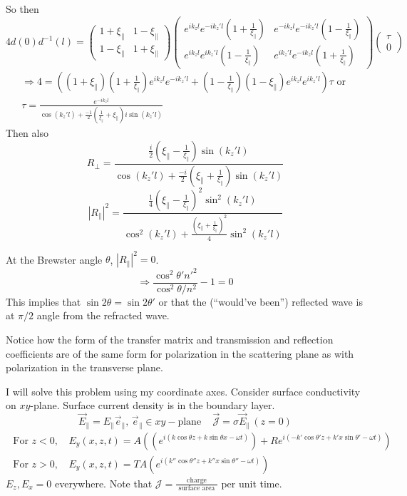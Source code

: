\documentclass[twoside,10pt]{amsart}
\newcommand{\problemhead}[1]
  {\smallskip
   \noindent{\large\bf Problem #1.}
   \smallskip}
\begin{document}
So then 
\[
4 d(0) d^{-1}(l) = \left( \begin{matrix} 1 + \xi_{\parallel} & 1 - \xi_{\parallel} \\ 1 - \xi_{\parallel} & 1 + \xi_{\parallel} \end{matrix} \right) \left( \begin{matrix} e^{ik_z l} e^{-ik_z' l} ( 1 + \frac{1}{\xi_{\parallel}} ) & e^{-ik_zl }e^{-ik_z' l} (1 - \frac{1}{\xi_{\parallel} } ) \\ e^{ik_z l}e^{ i k_z' l} (1 - \frac{1}{\xi_{\parallel} }) & e^{ik_z'l} e^{-ik_z l} (1 + \frac{1}{\xi_{\parallel} }) \end{matrix} \right) \left( \begin{matrix} \tau \\ 0 \end{matrix} \right)
\]
\[
\begin{gathered}
  \Longrightarrow 4 = ((1+\xi_{\parallel} )(1 + \frac{1}{\xi_{\parallel} } ) e^{i k_z l } e^{-ik_z' l} + ( 1 - \frac{1}{\xi_{\parallel}} )( 1 -\xi_{\parallel} ) e^{ik_z l} e^{ik_z' l} )\tau \text{ or } \\
  \tau = \frac{ e^{-i k_zl } }{ \cos{(k_z' l) } + \frac{-1}{2} (\frac{1}{\xi_{\parallel}} + \xi_{\parallel} ) i \sin{(k_z' l) } }
\end{gathered}
\]
Then also
\[
R_{\perp} =\frac{ \frac{i}{2} ( \xi_{\parallel} - \frac{1}{\xi_{\parallel} } ) \sin{(k_z' l) } }{ \cos{(k_z' l)} + \frac{-i}{2} (\xi_{\parallel} + \frac{1}{\xi_{\parallel}} )\sin{(k_z' l) }}
\]
\[
|R_{\parallel}|^2 = \frac{ \frac{1}{4} ( \xi_{\parallel} - \frac{1}{ \xi_{\parallel}})^2 \sin^2{ (k_z' l) } }{ \cos^2{( k_z' l) } + \frac{ (\xi_{\parallel} + \frac{1}{ \xi_{\parallel} } )^2 }{ 4} \sin^2{ (k_z' l) } }
\]

At the Brewster angle $\theta$, $|R_{\parallel}|^2 =0$.  
\[
\Longrightarrow \frac{ \cos^2{\theta'}{n'^2} }{ \cos^2{\theta} /n^2 } - 1 =0 
\]
This implies that $\sin{2\theta} = \sin{2\theta'}$ or that the (``would've been'') reflected wave is at $\pi/2$ angle from the refracted wave.

Notice how the form of the transfer matrix and transmission and reflection coefficients are of the same form for polarization in the scattering plane as with polarization in the transverse plane.  

\problemhead{12.2} I will solve this problem using my coordinate axes.  Consider surface conductivity on $xy$-plane.  Surface current density is in the boundary layer.  
\[
\vec{E}_{\parallel} = E_{\parallel} \vec{e}_{\parallel}, \, \vec{e}_{\parallel} \in xy-\text{plane} \quad \, \vec{\mathcal{J}} = \sigma \vec{E}_{\parallel} \, (z=0)
\]
\[
\begin{aligned} 
\text{ For $z<0$, } & E_y(x,z,t) = A ((e^{i (k\cos{\theta} z + k \sin{\theta} x - \omega t) } ) + R e^{ i (-k' \cos{\theta'} z + k' x \sin{\theta' } - \omega t ) } ) \\ 
\text{ For $z>0$, } & E_y(x,z,t) = TA ( e^{ i (k'' \cos{\theta''} z + k'' x \sin{\theta'' } - \omega t) } ) \end{aligned}
\] 
$E_z, E_x =0$ everywhere.  
Note that $\mathcal{J} = \frac{ \text{ charge } }{ \text{ surface area } }$ per unit time.  
\end{document}
